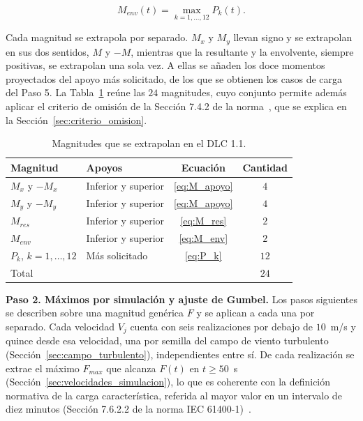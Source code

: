 \begin{equation}
    M_{env}(t) = \max_{k=1,\dots,12} P_k(t).
    \label{eq:M_env}
\end{equation}

Cada magnitud se extrapola por separado. $M_x$ y $M_y$ llevan signo y se extrapolan en sus dos sentidos, $M$ y $-M$, mientras que la resultante y la envolvente, siempre positivas, se extrapolan una sola vez. A ellas se añaden los doce momentos proyectados del apoyo más solicitado, de los que se obtienen los casos de carga del Paso 5. La Tabla~\ref{tab:magnitudes_extrapoladas} reúne las $24$ magnitudes, cuyo conjunto permite además aplicar el criterio de omisión de la Sección 7.4.2 de la norma~\parencite{IEC61400-1}, que se explica en la Sección~\ref{sec:criterio_omision}.

\begin{table}[H]
    \centering
    \caption{Magnitudes que se extrapolan en el DLC 1.1.}
    \label{tab:magnitudes_extrapoladas}
    \begin{tabular}{llcc}
        \hline
        \textbf{Magnitud} & \textbf{Apoyos} & \textbf{Ecuación} & \textbf{Cantidad} \\
        \hline
        $M_x$ y $-M_x$ & Inferior y superior & \ref{eq:M_apoyo} & $4$ \\
        $M_y$ y $-M_y$ & Inferior y superior & \ref{eq:M_apoyo} & $4$ \\
        $M_{res}$ & Inferior y superior & \ref{eq:M_res} & $2$ \\
        $M_{env}$ & Inferior y superior & \ref{eq:M_env} & $2$ \\
        $P_k$, $k = 1,\dots,12$ & Más solicitado & \ref{eq:P_k} & $12$ \\
        \hline
        \multicolumn{3}{l}{Total} & $24$ \\
        \hline
    \end{tabular}
\end{table}

\medskip
\noindent\textbf{Paso 2. Máximos por simulación y ajuste de Gumbel.}
Los pasos siguientes se describen sobre una magnitud genérica $F$ y se aplican a cada una por separado. Cada velocidad $V_j$ cuenta con seis realizaciones por debajo de $10$~m/s y quince desde esa velocidad, una por semilla del campo de viento turbulento (Sección~\ref{sec:campo_turbulento}), independientes entre sí. De cada realización se extrae el máximo $F_{max}$ que alcanza $F(t)$ en $t \geq 50$~s (Sección~\ref{sec:velocidades_simulacion}), lo que es coherente con la definición normativa de la carga característica, referida al mayor valor en un intervalo de diez minutos (Sección 7.6.2.2 de la norma IEC 61400-1)~\parencite*{IEC61400-1}.

